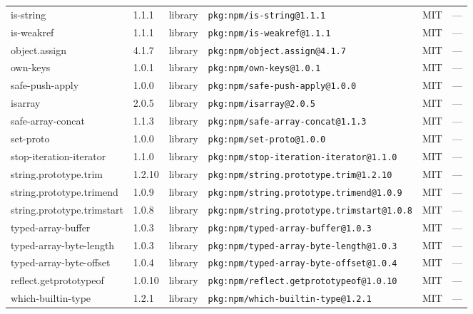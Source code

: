 \documentclass[11pt,a4paper]{article}
\begin{document}
\begin{longtable}{|p{4cm}|p{2cm}|p{1.6cm}|p{5cm}|p{1.5cm}|p{3.5cm}|}
\raggedright is-string & 1.1.1 & library & \small\texttt{pkg:npm/is-string@1.1.1} & MIT & \small — \\
\raggedright is-weakref & 1.1.1 & library & \small\texttt{pkg:npm/is-weakref@1.1.1} & MIT & \small — \\
\raggedright object.assign & 4.1.7 & library & \small\texttt{pkg:npm/object.assign@4.1.7} & MIT & \small — \\
\raggedright own-keys & 1.0.1 & library & \small\texttt{pkg:npm/own-keys@1.0.1} & MIT & \small — \\
\raggedright safe-push-apply & 1.0.0 & library & \small\texttt{pkg:npm/safe-push-apply@1.0.0} & MIT & \small — \\
\raggedright isarray & 2.0.5 & library & \small\texttt{pkg:npm/isarray@2.0.5} & MIT & \small — \\
\raggedright safe-array-concat & 1.1.3 & library & \small\texttt{pkg:npm/safe-array-concat@1.1.3} & MIT & \small — \\
\raggedright set-proto & 1.0.0 & library & \small\texttt{pkg:npm/set-proto@1.0.0} & MIT & \small — \\
\raggedright stop-iteration-iterator & 1.1.0 & library & \small\texttt{pkg:npm/stop-iteration-iterator@1.1.0} & MIT & \small — \\
\raggedright string.prototype.trim & 1.2.10 & library & \small\texttt{pkg:npm/string.prototype.trim@1.2.10} & MIT & \small — \\
\raggedright string.prototype.trimend & 1.0.9 & library & \small\texttt{pkg:npm/string.prototype.trimend@1.0.9} & MIT & \small — \\
\raggedright string.prototype.trimstart & 1.0.8 & library & \small\texttt{pkg:npm/string.prototype.trimstart@1.0.8} & MIT & \small — \\
\raggedright typed-array-buffer & 1.0.3 & library & \small\texttt{pkg:npm/typed-array-buffer@1.0.3} & MIT & \small — \\
\raggedright typed-array-byte-length & 1.0.3 & library & \small\texttt{pkg:npm/typed-array-byte-length@1.0.3} & MIT & \small — \\
\raggedright typed-array-byte-offset & 1.0.4 & library & \small\texttt{pkg:npm/typed-array-byte-offset@1.0.4} & MIT & \small — \\
\raggedright reflect.getprototypeof & 1.0.10 & library & \small\texttt{pkg:npm/reflect.getprototypeof@1.0.10} & MIT & \small — \\
\raggedright which-builtin-type & 1.2.1 & library & \small\texttt{pkg:npm/which-builtin-type@1.2.1} & MIT & \small — \\

\end{longtable}
\end{document}
